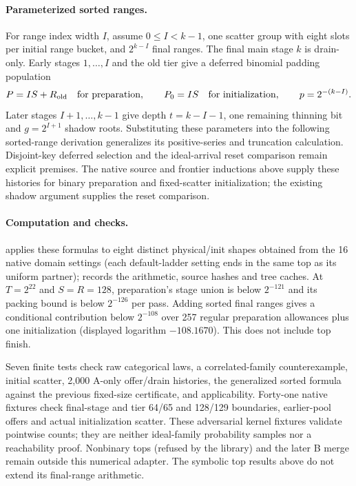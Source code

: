\documentclass[11pt]{article}
\theoremstyle{definition}
\theoremstyle{remark}
\begin{document}
\paragraph{Parameterized sorted ranges.}
For range index width $I$, assume $0\le I<k-1$, one scatter group with
eight slots per initial range bucket, and $2^{k-I}$ final ranges. The final
main stage $k$ is drain-only. Early stages $1,\ldots,I$ and the old tier
give a deferred binomial padding population
\[
 P=IS+R_{\rm old}\quad\hbox{for preparation},\qquad
 P_0=IS\quad\hbox{for initialization},\qquad p=2^{-(k-I)}.
\]
Later stages $I+1,\ldots,k-1$ give depth $t=k-I-1$, one remaining thinning
bit and $g=2^{I+1}$ shadow roots. Substituting these parameters into the
following sorted-range derivation generalizes its positive-series and
truncation calculation. Disjoint-key deferred selection and the ideal-arrival
reset comparison remain explicit premises. The native source and frontier inductions above supply these histories
for binary preparation and fixed-scatter initialization; the existing
shadow argument supplies the reset comparison.

\paragraph{Computation and checks.}
 applies these formulas to eight
distinct physical/init shapes obtained from the 16 native domain settings
(each default-ladder setting ends in the same top as its uniform partner);
 records the arithmetic,
source hashes and tree caches. At $T=2^{22}$ and $S=R=128$, preparation's
stage union is below $2^{-121}$ and its packing bound is below $2^{-126}$
per pass. Adding sorted final ranges gives a conditional contribution below
$2^{-108}$ over 257 regular preparation allowances plus one initialization
(displayed logarithm $-108.1670$). This does not include top finish.

Seven finite tests check raw categorical laws, a correlated-family
counterexample, initial scatter, 2,000 A-only offer/drain histories, the
generalized sorted formula against the previous fixed-size certificate,
and applicability. Forty-one native fixtures check final-stage and tier
64/65 and 128/129 boundaries, earlier-pool offers and actual initialization
scatter. These adversarial kernel fixtures validate pointwise counts;
they are neither ideal-family probability samples nor a reachability proof.
Nonbinary tops (refused by the library) and the later B merge remain
outside this numerical adapter. The symbolic top results above do not
extend its final-range arithmetic.
\end{document}
